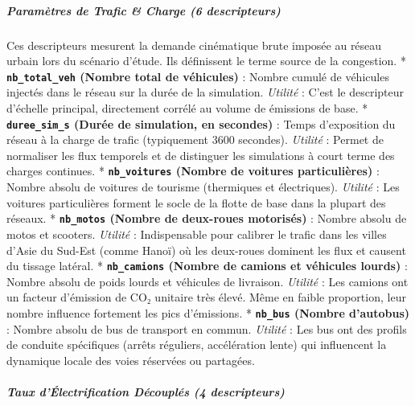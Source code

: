 \documentclass[10pt, a4paper]{article}
\begin{document}
\subparagraph{Paramètres de Trafic \& Charge (6
descripteurs)}\label{paramuxe8tres-de-trafic-charge-6-descripteurs}

Ces descripteurs mesurent la demande cinématique brute imposée au réseau
urbain lors du scénario d'étude. Ils définissent le terme source de la
congestion. * \textbf{\texttt{nb\_total\_veh} (Nombre total de
véhicules)} : Nombre cumulé de véhicules injectés dans le réseau sur la
durée de la simulation. \emph{Utilité} : C'est le descripteur d'échelle
principal, directement corrélé au volume de émissions de base. *
\textbf{\texttt{duree\_sim\_s} (Durée de simulation, en secondes)} :
Temps d'exposition du réseau à la charge de trafic (typiquement 3600
secondes). \emph{Utilité} : Permet de normaliser les flux temporels et
de distinguer les simulations à court terme des charges continues. *
\textbf{\texttt{nb\_voitures} (Nombre de voitures particulières)} :
Nombre absolu de voitures de tourisme (thermiques et électriques).
\emph{Utilité} : Les voitures particulières forment le socle de la
flotte de base dans la plupart des réseaux. * \textbf{\texttt{nb\_motos}
(Nombre de deux-roues motorisés)} : Nombre absolu de motos et scooters.
\emph{Utilité} : Indispensable pour calibrer le trafic dans les villes
d'Asie du Sud-Est (comme Hanoï) où les deux-roues dominent les flux et
causent du tissage latéral. * \textbf{\texttt{nb\_camions} (Nombre de
camions et véhicules lourds)} : Nombre absolu de poids lourds et
véhicules de livraison. \emph{Utilité} : Les camions ont un facteur
d'émission de CO₂ unitaire très élevé. Même en faible proportion, leur
nombre influence fortement les pics d'émissions. *
\textbf{\texttt{nb\_bus} (Nombre d'autobus)} : Nombre absolu de bus de
transport en commun. \emph{Utilité} : Les bus ont des profils de
conduite spécifiques (arrêts réguliers, accélération lente) qui
influencent la dynamique locale des voies réservées ou partagées.

\subparagraph{Taux d'Électrification Découplés (4
descripteurs)}\label{taux-duxe9lectrification-duxe9coupluxe9s-4-descripteurs}
\end{document}
